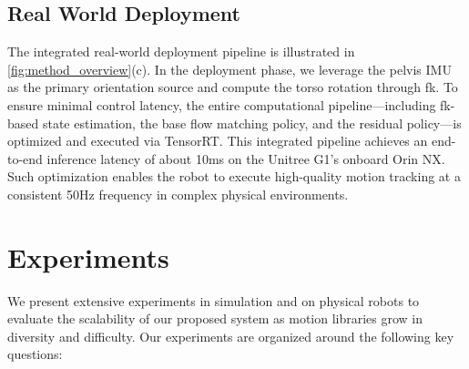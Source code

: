 % 


\subsection{Real World Deployment}
The integrated real-world deployment pipeline is illustrated in \cref{fig:method_overview}(c). In the deployment phase, we leverage the pelvis IMU as the primary orientation source and compute the torso rotation through \ac{fk}. To ensure minimal control latency, the entire computational pipeline—including \ac{fk}-based state estimation, the base flow matching policy, and the residual policy—is optimized and executed via TensorRT. This integrated pipeline achieves an end-to-end inference latency of about 10ms on the Unitree G1’s onboard Orin NX. Such optimization enables the robot to execute high-quality motion tracking at a consistent 50Hz frequency in complex physical environments.
\section{Experiments}
We present extensive experiments in simulation and on physical robots to evaluate the scalability of our proposed \model system as motion libraries grow in diversity and difficulty. Our experiments are organized around the following key questions:


